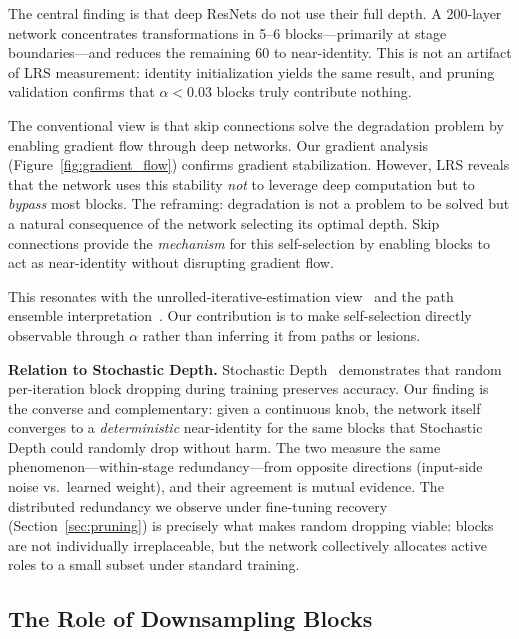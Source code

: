 \documentclass{bmvc2k}
\begin{document}
The central finding is that deep ResNets do not use their full depth. A 200-layer network concentrates transformations in 5--6 blocks---primarily at stage boundaries---and reduces the remaining 60 to near-identity. This is not an artifact of LRS measurement: identity initialization yields the same result, and pruning validation confirms that $\alpha < 0.03$ blocks truly contribute nothing.

The conventional view is that skip connections solve the degradation problem by enabling gradient flow through deep networks. Our gradient analysis (Figure~\ref{fig:gradient_flow}) confirms gradient stabilization. However, LRS reveals that the network uses this stability \emph{not} to leverage deep computation but to \emph{bypass} most blocks. The reframing: degradation is not a problem to be solved but a natural consequence of the network selecting its optimal depth. Skip connections provide the \emph{mechanism} for this self-selection by enabling blocks to act as near-identity without disrupting gradient flow.

This resonates with the unrolled-iterative-estimation view~\cite{greff2017highway} and the path ensemble interpretation~\cite{veit2016residual}. Our contribution is to make self-selection directly observable through $\alpha$ rather than inferring it from paths or lesions.

\textbf{Relation to Stochastic Depth.} Stochastic Depth~\cite{huang2016deep} demonstrates that random per-iteration block dropping during training preserves accuracy. Our finding is the converse and complementary: given a continuous knob, the network itself converges to a \emph{deterministic} near-identity for the same blocks that Stochastic Depth could randomly drop without harm. The two measure the same phenomenon---within-stage redundancy---from opposite directions (input-side noise vs.\ learned weight), and their agreement is mutual evidence. The distributed redundancy we observe under fine-tuning recovery (Section~\ref{sec:pruning}) is precisely what makes random dropping viable: blocks are not individually irreplaceable, but the network collectively allocates active roles to a small subset under standard training.

\subsection{The Role of Downsampling Blocks}
\label{sec:downsampling_role}
\end{document}
